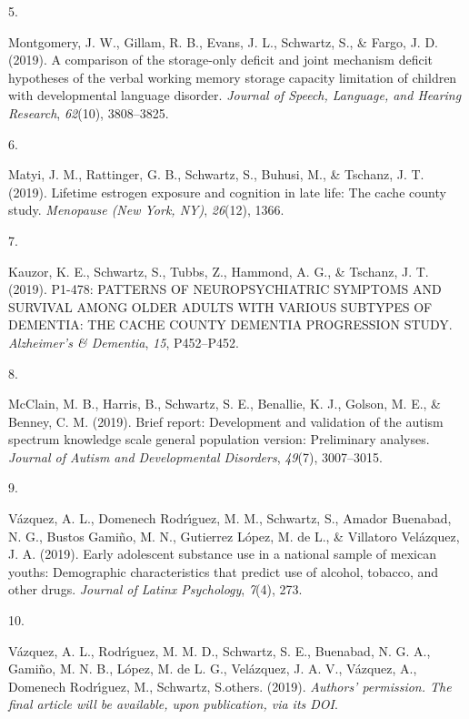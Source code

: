\documentclass[11pt,a4paper,]{moderncv}
\newlength{\csllabelwidth}
\newcommand{\CSLLeftMargin}[1]{\parbox[t]{\csllabelwidth}{#1}}
\newcommand{\CSLRightInline}[1]{\parbox[t]{\linewidth - \csllabelwidth}{#1}}
\begin{document}
\leavevmode{}%
\CSLLeftMargin{5. }
\CSLRightInline{Montgomery, J. W., Gillam, R. B., Evans, J. L.,
Schwartz, S., \& Fargo, J. D. (2019). A comparison of the storage-only
deficit and joint mechanism deficit hypotheses of the verbal working
memory storage capacity limitation of children with developmental
language disorder. \emph{Journal of Speech, Language, and Hearing
Research}, \emph{62}(10), 3808--3825.}

\leavevmode{}%
\CSLLeftMargin{6. }
\CSLRightInline{Matyi, J. M., Rattinger, G. B., Schwartz, S., Buhusi,
M., \& Tschanz, J. T. (2019). Lifetime estrogen exposure and cognition
in late life: The cache county study. \emph{Menopause (New York, NY)},
\emph{26}(12), 1366.}

\leavevmode{}%
\CSLLeftMargin{7. }
\CSLRightInline{Kauzor, K. E., Schwartz, S., Tubbs, Z., Hammond, A. G.,
\& Tschanz, J. T. (2019). P1-478: PATTERNS OF NEUROPSYCHIATRIC SYMPTOMS
AND SURVIVAL AMONG OLDER ADULTS WITH VARIOUS SUBTYPES OF DEMENTIA: THE
CACHE COUNTY DEMENTIA PROGRESSION STUDY. \emph{Alzheimer's \& Dementia},
\emph{15}, P452--P452.}

\leavevmode{}%
\CSLLeftMargin{8. }
\CSLRightInline{McClain, M. B., Harris, B., Schwartz, S. E., Benallie,
K. J., Golson, M. E., \& Benney, C. M. (2019). Brief report: Development
and validation of the autism spectrum knowledge scale general population
version: Preliminary analyses. \emph{Journal of Autism and Developmental
Disorders}, \emph{49}(7), 3007--3015.}

\leavevmode{}%
\CSLLeftMargin{9. }
\CSLRightInline{Vázquez, A. L., Domenech Rodrı́guez, M. M., Schwartz, S.,
Amador Buenabad, N. G., Bustos Gamiño, M. N., Gutierrez López, M. de L.,
\& Villatoro Velázquez, J. A. (2019). Early adolescent substance use in
a national sample of mexican youths: Demographic characteristics that
predict use of alcohol, tobacco, and other drugs. \emph{Journal of
Latinx Psychology}, \emph{7}(4), 273.}

\leavevmode{}%
\CSLLeftMargin{10. }
\CSLRightInline{Vázquez, A. L., Rodrı́guez, M. M. D., Schwartz, S. E.,
Buenabad, N. G. A., Gamiño, M. N. B., López, M. de L. G., Velázquez, J.
A. V., Vázquez, A., Domenech Rodrı́guez, M., Schwartz, S.others. (2019).
\emph{Authors' permission. The final article will be available, upon
publication, via its DOI}.}
\end{document}
